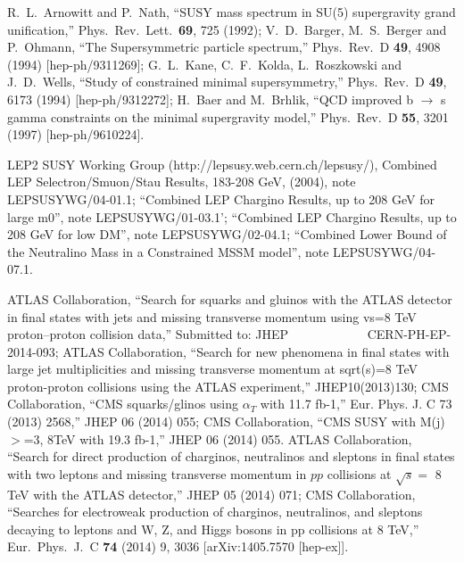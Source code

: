 \documentclass[11pt,a4paper]{article}
\begin{document}
\begin{thebibliography}{99}
R.~L.~Arnowitt and P.~Nath,
  ``SUSY mass spectrum in SU(5) supergravity grand unification,''
  Phys.\ Rev.\ Lett.\  {\bf 69}, 725 (1992);
 V.~D.~Barger, M.~S.~Berger and P.~Ohmann,
  ``The Supersymmetric particle spectrum,''
  Phys.\ Rev.\ D {\bf 49}, 4908 (1994)
  [hep-ph/9311269];
  G.~L.~Kane, C.~F.~Kolda, L.~Roszkowski and J.~D.~Wells,
  ``Study of constrained minimal supersymmetry,''
  Phys.\ Rev.\ D {\bf 49}, 6173 (1994)
  [hep-ph/9312272];
H.~Baer and M.~Brhlik,
  ``QCD improved b $\rightarrow$ s gamma constraints on the minimal supergravity model,''
  Phys.\ Rev.\ D {\bf 55}, 3201 (1997)
  [hep-ph/9610224].

LEP2 SUSY Working Group (http://lepsusy.web.cern.ch/lepsusy/), Combined LEP Selectron/Smuon/Stau Results, 183-208 GeV,
(2004), note LEPSUSYWG/04-01.1; ``Combined LEP Chargino Results, up to 208 GeV for large m0'', note LEPSUSYWG/01-03.1'; ``Combined LEP Chargino Results, up to 208 GeV for low DM'', note  LEPSUSYWG/02-04.1; ``Combined Lower Bound of the Neutralino Mass in a Constrained MSSM model'', note
LEPSUSYWG/04-07.1.

ATLAS Collaboration,
``Search for squarks and gluinos with the ATLAS detector in final states with jets and missing transverse momentum using vs=8 TeV proton--proton collision data,''
 Submitted to: JHEP~~~~~~~~~~~~
CERN-PH-EP-2014-093;  %
ATLAS Collaboration,
``Search for new phenomena in final states with large jet multiplicities and missing transverse momentum at sqrt(s)=8 TeV proton-proton collisions using the ATLAS experiment,''
  JHEP10(2013)130;  %
CMS Collaboration,
  ``CMS squarks/glinos using $\alpha_T$ with 11.7 fb-1,''
Eur. Phys. J. C 73 (2013) 2568,''
JHEP 06 (2014) 055;  %
  CMS Collaboration,
  ``CMS SUSY with M(j) $>$=3,  8TeV with 19.3 fb-1,''
JHEP 06 (2014) 055.  %
 ATLAS Collaboration,
 ``Search for direct production of charginos, neutralinos and sleptons in final states with two leptons and missing transverse momentum in $pp$ collisions at $\sqrt{s} =$ 8 TeV with the ATLAS detector,''
  JHEP 05 (2014) 071;
   CMS Collaboration,
``Searches for electroweak production of charginos, neutralinos, and sleptons decaying to leptons and W, Z, and Higgs bosons in pp collisions at 8 TeV,''
  Eur.\ Phys.\ J.\ C {\bf 74} (2014) 9, 3036
  [arXiv:1405.7570 [hep-ex]].


\end{thebibliography}
\end{document}
